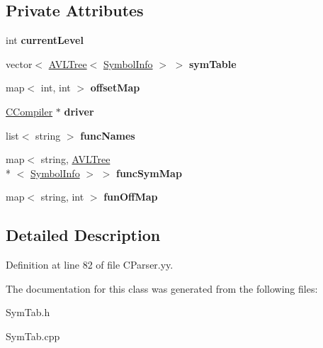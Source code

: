 \subsection*{Private Attributes}
\begin{DoxyCompactItemize}
\item 
\hypertarget{classSymTab_a6f708ee042ccbbd40be5c4d0f6f2913c}{int {\bfseries current\-Level}}\label{classSymTab_a6f708ee042ccbbd40be5c4d0f6f2913c}

\item 
\hypertarget{classSymTab_a80d93e28fe20ddd6a4154d9e9c96170d}{vector$<$ \hyperlink{classAVLTree}{A\-V\-L\-Tree}$<$ \hyperlink{structSymbolInfo}{Symbol\-Info} $>$ $>$ {\bfseries sym\-Table}}\label{classSymTab_a80d93e28fe20ddd6a4154d9e9c96170d}

\item 
\hypertarget{classSymTab_a5f05861df6fc8ba34b77bf00084e6eac}{map$<$ int, int $>$ {\bfseries offset\-Map}}\label{classSymTab_a5f05861df6fc8ba34b77bf00084e6eac}

\item 
\hypertarget{classSymTab_a4a3ff318d1346423faf7b07c3fa0fe7d}{\hyperlink{classCCompiler}{C\-Compiler} $\ast$ {\bfseries driver}}\label{classSymTab_a4a3ff318d1346423faf7b07c3fa0fe7d}

\item 
\hypertarget{classSymTab_a759219549efdb89be3eddc6bcc8f6c60}{list$<$ string $>$ {\bfseries func\-Names}}\label{classSymTab_a759219549efdb89be3eddc6bcc8f6c60}

\item 
\hypertarget{classSymTab_a2723abd7a5840f6eaca60d0370e8dbfa}{map$<$ string, \hyperlink{classAVLTree}{A\-V\-L\-Tree}\\*
$<$ \hyperlink{structSymbolInfo}{Symbol\-Info} $>$ $>$ {\bfseries func\-Sym\-Map}}\label{classSymTab_a2723abd7a5840f6eaca60d0370e8dbfa}

\item 
\hypertarget{classSymTab_a9226c645497e760d2ad630458318eee4}{map$<$ string, int $>$ {\bfseries fun\-Off\-Map}}\label{classSymTab_a9226c645497e760d2ad630458318eee4}

\end{DoxyCompactItemize}


\subsection{Detailed Description}


Definition at line 82 of file C\-Parser.\-yy.



The documentation for this class was generated from the following files\-:\begin{DoxyCompactItemize}
\item 
Sym\-Tab.\-h\item 
Sym\-Tab.\-cpp\end{DoxyCompactItemize}
